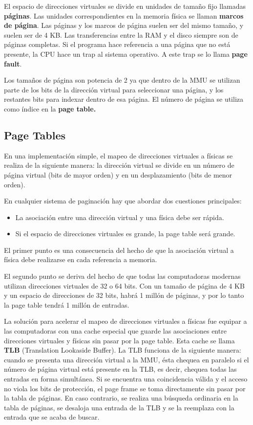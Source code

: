 El espacio de direcciones virtuales se divide en unidades de tamaño fijo llamadas \textbf{páginas}. Las unidades correspondientes en la memoria física se llaman \textbf{marcos de página}. Las páginas y los marcos de página suelen ser del mismo tamaño, y suelen ser de 4 KB. Las transferencias entre la RAM y el disco siempre son de páginas completas. Si el programa hace referencia a una página que no está presente, la CPU hace un trap al sistema operativo. A este trap se lo llama \textbf{page fault}.

Los tamaños de página son potencia de 2 ya que dentro de la MMU se utilizan parte de los bits de la dirección virtual para seleccionar una página, y los restantes bits para indexar dentro de esa página. El número de página se utiliza como índice en la \textbf{page table.}

\subsection{Page Tables}

En una implementación simple, el mapeo de direcciones virtuales a físicas se realiza de la siguiente manera: la dirección virtual se divide en un número de página virtual (bits de mayor orden) y en un desplazamiento (bits de menor orden).

En cualquier sistema de paginación hay que abordar dos cuestiones principales:

\begin{itemize}
\item La asociación entre una dirección virtual y una física debe ser rápida.

\item Si el espacio de direcciones virtuales es grande, la page table será grande.
\end{itemize}

El primer punto es una consecuencia del hecho de que la asociación virtual a física debe realizarse en cada referencia a memoria.

El segundo punto se deriva del hecho de que todas las computadoras modernas utilizan direcciones virtuales de 32 o 64 bits. Con un tamaño de página de 4 KB y un espacio de direcciones de 32 bits, habrá 1 millón de páginas, y por lo tanto la page table tendrá 1 millón de entradas.

La solución para acelerar el mapeo de direcciones virtuales a físicas fue equipar a las computadoras con una cache especial que guarde las asociaciones entre direcciones virtuales y físicas sin pasar por la page table. Esta cache se llama \textbf{TLB} (Translation Lookaside Buffer). La TLB funciona de la siguiente manera: cuando se presenta una dirección virtual a la MMU, ésta chequea en paralelo si el número de página virtual está presente en la TLB, es decir, chequea todas las entradas en forma simultánea. Si se encuentra una coincidencia válida y el acceso no viola los bits de protección, el page frame se toma directamente sin pasar por la tabla de páginas. En caso contrario, se realiza una búsqueda ordinaria en la tabla de páginas, se desaloja una entrada de la TLB y se la reemplaza con la entrada que se acaba de buscar.

